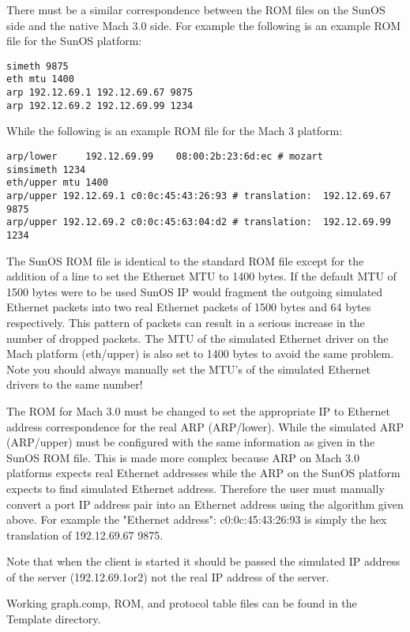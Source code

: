 There must be a similar correspondence between the ROM files on the 
SunOS side and the native Mach 3.0 side. For example the following 
is an example ROM file for the SunOS platform:

\begin{verbatim}
simeth 9875
eth mtu 1400
arp 192.12.69.1 192.12.69.67 9875
arp 192.12.69.2 192.12.69.99 1234
\end{verbatim}


While the following is an example ROM file for the Mach 3 
platform:

\begin{verbatim}
arp/lower     192.12.69.99    08:00:2b:23:6d:ec # mozart 
simsimeth 1234
eth/upper mtu 1400
arp/upper 192.12.69.1 c0:0c:45:43:26:93 # translation:  192.12.69.67 9875
arp/upper 192.12.69.2 c0:0c:45:63:04:d2 # translation:  192.12.69.99 1234
\end{verbatim}

The SunOS ROM file is identical to the standard ROM file except for the
addition of a line to set the Ethernet MTU to 1400 bytes. 
If the default MTU of 1500 bytes were to be used SunOS IP would 
fragment the outgoing simulated Ethernet packets into two 
real Ethernet packets of 1500 bytes and 64 bytes respectively. 
This pattern of packets can result in a serious increase in the number 
of dropped packets. The MTU of the simulated Ethernet driver 
on the Mach platform (eth/upper) is also set to 1400 bytes to 
avoid the same problem. Note you should always manually set 
the MTU's of the simulated Ethernet drivers to the same number!

The ROM for Mach 3.0 must be changed 
to set the appropriate IP to Ethernet address correspondence for the real
ARP (ARP/lower). While the simulated ARP (ARP/upper) must be configured 
with the same information as given in the SunOS ROM file. This is made
more complex because ARP on Mach 3.0 platforms expects real Ethernet 
addresses while the ARP on the SunOS platform expects to find simulated
Ethernet address. Therefore the user must manually convert a port 
IP address pair into an Ethernet address using the algorithm given 
above. For example the "Ethernet address": c0:0c:45:43:26:93 is 
simply the hex translation of 192.12.69.67 9875. 

Note that when the client is started it should be passed the simulated 
IP address of the server (192.12.69.{1or2}) not the real IP address 
of the server.

Working graph.comp, ROM, and protocol table files can be found in the 
Template directory. 

